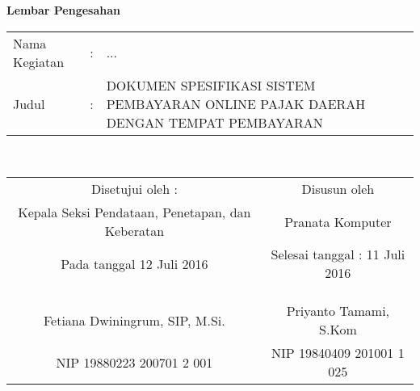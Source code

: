 \begin{center}

{\huge \bfseries Lembar Pengesahan}\\[0.4cm]

\begin{tabular}{l c p{10cm}}
  Nama Kegiatan & : & ... \\
  Judul & : & DOKUMEN SPESIFIKASI SISTEM PEMBAYARAN ONLINE PAJAK DAERAH DENGAN TEMPAT PEMBAYARAN \\
\end{tabular}\\[2cm]

\begin{tabular}{c c}
  Disetujui oleh : & Disusun oleh \\
  Kepala Seksi Pendataan, Penetapan, dan Keberatan & Pranata Komputer \\
  Pada tanggal 12 Juli 2016 & Selesai tanggal : 11 Juli 2016 \\
  & \\
  & \\
  & \\
  Fetiana Dwiningrum, SIP, M.Si. & Priyanto Tamami, S.Kom \\
  NIP 19880223 200701 2 001 & NIP 19840409 201001 1 025
\end{tabular}

\end{center}